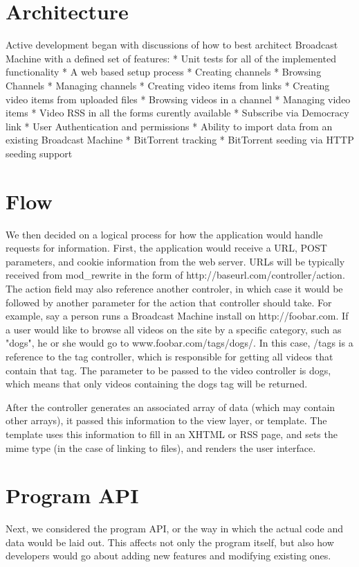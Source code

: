 \documentclass[a4paper,12pt]{report}
\begin{document}
\begin{description}
\section{Architecture}
Active development began with discussions of how to best architect Broadcast Machine with a defined set of features:
  * Unit tests for all of the implemented functionality
  * A web based setup process
  * Creating channels
  * Browsing Channels
  * Managing channels
  * Creating video items from links
  * Creating video items from uploaded files
  * Browsing videos in a channel
  * Managing video items
  * Video RSS in all the forms curently available
  * Subscribe via Democracy link
  * User Authentication and permissions
  * Ability to import data from an existing Broadcast Machine
  * BitTorrent tracking
  * BitTorrent seeding via HTTP seeding support

\section{Flow}
We then decided on a logical process for how the application would handle requests for information. First, the application would receive a URL, POST parameters, and cookie information from the web server. URLs will be typically received from mod_rewrite in the form of http://baseurl.com/controller/action. The action field may also reference another controler, in which case it would be followed by another parameter for the action that controller should take. For example, say a person runs a Broadcast Machine install on http://foobar.com. If a user would like to browse all videos on the site by a specific category, such as "dogs", he or she would go to www.foobar.com/tags/dogs/. In this case, /tags is a reference to the tag controller, which is responsible for getting all videos that contain that tag. The parameter to be passed to the video controller is dogs, which means that only videos containing the dogs tag will be returned. 

After the controller generates an associated array of data (which may contain other arrays), it passed this information to the view layer, or template. The template uses this information to fill in an XHTML or RSS page, and sets the mime type (in the case of linking to files), and renders the user interface.

\section{Program API}
Next, we considered the program API, or the way in which the actual code and data would be laid out. This affects not only the program itself, but also how developers would go about adding new features and modifying existing ones.


\end{description}
\end{document}
